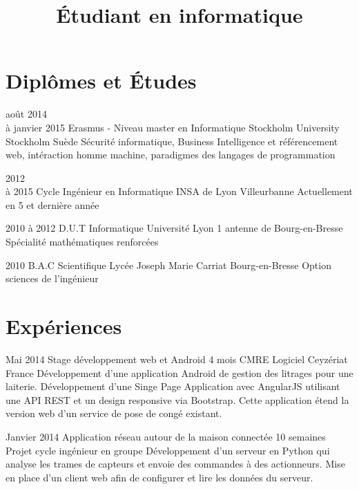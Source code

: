 \documentclass[10pt,a4paper]{moderncv}
\title{Étudiant en informatique}
\begin{document}
\maketitle
\pagestyle{empty}


\section{Diplômes et Études}

\cventry
	{août 2014\\à janvier 2015}
	{Erasmus - Niveau master en Informatique}
	{Stockholm University}
	{Stockholm}
	{Suède}
	{Sécurité informatique, Business Intelligence et référencement web, intéraction homme machine, paradigmes des langages de programmation}

\cventry
	{2012\\à 2015}
	{Cycle Ingénieur en Informatique}
	{INSA de Lyon}
	{Villeurbanne}
	{}
	{Actuellement en 5 et dernière année}

\cventry
	{2010 à 2012}
	{D.U.T Informatique}
	{Université Lyon 1}
	{antenne de Bourg-en-Bresse}
	{}
	{Spécialité mathématiques renforcées}

\cventry
	{2010}
	{B.A.C Scientifique}
	{Lycée Joseph Marie Carriat}
	{Bourg-en-Bresse}
	{}
	{Option sciences de l'ingénieur}


\section{Expériences}

\cventry
	{Mai 2014}
	{Stage développement web et Android}
	{4 mois}
	{CMRE Logiciel}
	{Ceyzériat France}
	{Développement d'une application Android de gestion des litrages pour une laiterie. Développement d'une Singe Page Application avec AngularJS utilisant une API REST et un design responsive via Bootstrap. Cette application étend la version web d'un service de pose de congé existant.}

\cventry
	{Janvier 2014}
	{Application réseau autour de la maison connectée}
	{10 semaines}
	{}
	{Projet cycle ingénieur en groupe}
	{Développement d'un serveur en Python qui analyse les trames de capteurs et envoie des commandes à des actionneurs. Mise en place d'un client web afin de configurer et lire les données du serveur.}
\end{document}
